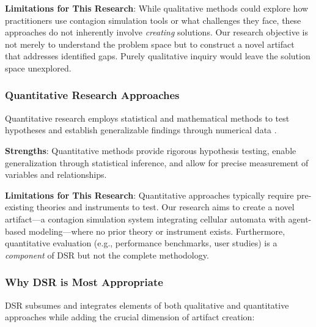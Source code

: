\textbf{Limitations for This Research}: While qualitative methods could explore how practitioners use contagion simulation tools or what challenges they face, these approaches do not inherently involve \textit{creating} solutions. Our research objective is not merely to understand the problem space but to construct a novel artifact that addresses identified gaps. Purely qualitative inquiry would leave the solution space unexplored.

\subsubsection{Quantitative Research Approaches}

Quantitative research employs statistical and mathematical methods to test hypotheses and establish generalizable findings through numerical data \cite{cohen2018research}.

\textbf{Strengths}: Quantitative methods provide rigorous hypothesis testing, enable generalization through statistical inference, and allow for precise measurement of variables and relationships.

\textbf{Limitations for This Research}: Quantitative approaches typically require pre-existing theories and instruments to test. Our research aims to create a novel artifact---a contagion simulation system integrating cellular automata with agent-based modeling---where no prior theory or instrument exists. Furthermore, quantitative evaluation (e.g., performance benchmarks, user studies) is a \textit{component} of DSR but not the complete methodology.

\subsubsection{Why DSR is Most Appropriate}

DSR subsumes and integrates elements of both qualitative and quantitative approaches while adding the crucial dimension of artifact creation:

